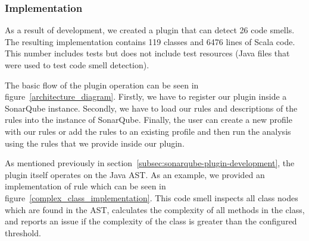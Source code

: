 
\subsubsection{Implementation}\label{subsec:implementation}

As a result of development, we created a plugin that can detect 26 code smells.
The resulting implementation contains 119 classes and 6476 lines of Scala code.
This number includes tests but does not include test resources (Java files that were
used to test code smell detection).

The basic flow of the plugin operation can be seen in figure~\ref{architecture_diagram}.
Firstly, we have to register our plugin inside a SonarQube instance.
Secondly, we have to load our rules and descriptions of the rules into the instance of SonarQube.
Finally, the user can create a new profile with our rules or add the rules to an existing
profile and then run the analysis using the rules that we provide inside our plugin.

As mentioned previously in section~\ref{subsec:sonarqube-plugin-development}, the plugin itself operates on the Java
AST\@.
As an example, we provided an implementation of  rule which can be seen in figure~\ref{complex_class_implementation}.
This code smell inspects all class nodes which are found in the AST, calculates the complexity of all methods
in the class, and reports an issue if the complexity of the class is greater than the configured threshold.


